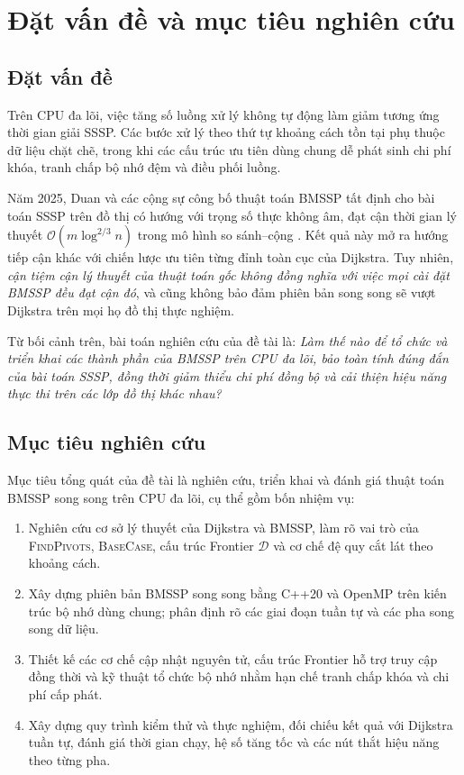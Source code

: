 \section{Đặt vấn đề và mục tiêu nghiên cứu}
\label{sec:dat-van-de}

\subsection{Đặt vấn đề}

Trên CPU đa lõi, việc tăng số luồng xử lý không tự động làm giảm tương ứng thời gian giải SSSP. Các bước xử lý theo thứ tự khoảng cách tồn tại phụ thuộc dữ liệu chặt chẽ, trong khi các cấu trúc ưu tiên dùng chung dễ phát sinh chi phí khóa, tranh chấp bộ nhớ đệm và điều phối luồng.

Năm 2025, Duan và các cộng sự công bố thuật toán BMSSP tất định cho bài toán SSSP trên đồ thị có hướng với trọng số thực không âm, đạt cận thời gian lý thuyết $\mathcal{O}(m\log^{2/3}n)$ trong mô hình so sánh--cộng \cite{duan2025breaking}. Kết quả này mở ra hướng tiếp cận khác với chiến lược ưu tiên từng đỉnh toàn cục của Dijkstra. Tuy nhiên, \emph{cận tiệm cận lý thuyết của thuật toán gốc không đồng nghĩa với việc mọi cài đặt BMSSP đều đạt cận đó}, và cũng không bảo đảm phiên bản song song sẽ vượt Dijkstra trên mọi họ đồ thị thực nghiệm.

Từ bối cảnh trên, bài toán nghiên cứu của đề tài là: \textit{Làm thế nào để tổ chức và triển khai các thành phần của BMSSP trên CPU đa lõi, bảo toàn tính đúng đắn của bài toán SSSP, đồng thời giảm thiểu chi phí đồng bộ và cải thiện hiệu năng thực thi trên các lớp đồ thị khác nhau?}

\subsection{Mục tiêu nghiên cứu}

Mục tiêu tổng quát của đề tài là nghiên cứu, triển khai và đánh giá thuật toán BMSSP song song trên CPU đa lõi, cụ thể gồm bốn nhiệm vụ:
\begin{enumerate}
    \item Nghiên cứu cơ sở lý thuyết của Dijkstra và BMSSP, làm rõ vai trò của 
    \textsc{FindPivots}, \textsc{BaseCase}, cấu trúc Frontier $\mathcal{D}$ và cơ chế đệ quy cắt lát theo khoảng cách.
    \item Xây dựng phiên bản BMSSP song song bằng C++20 và OpenMP trên kiến trúc bộ nhớ dùng chung; phân định rõ các giai đoạn tuần tự và các pha song song dữ liệu.
    \item Thiết kế các cơ chế cập nhật nguyên tử, cấu trúc Frontier hỗ trợ truy cập đồng thời và kỹ thuật tổ chức bộ nhớ nhằm hạn chế tranh chấp khóa và chi phí cấp phát.
    \item Xây dựng quy trình kiểm thử và thực nghiệm, đối chiếu kết quả với Dijkstra tuần tự, đánh giá thời gian chạy, hệ số tăng tốc và các nút thắt hiệu năng theo từng pha.
\end{enumerate}

